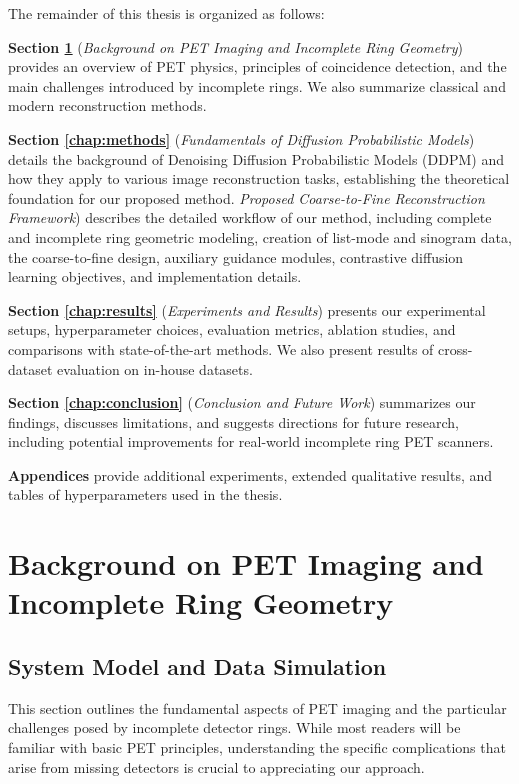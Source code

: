 \documentclass[
reprint,
superscriptaddress,
nofootinbib,
amsmath,amssymb,
aps,
prd,
]{revtex4-2}
\begin{document}
The remainder of this thesis is organized as follows:

\textbf{Section \ref{chap:background}} (\emph{Background on PET Imaging and Incomplete Ring Geometry}) provides an overview of PET physics, principles of coincidence detection, and the main challenges introduced by incomplete rings. We also summarize classical and modern reconstruction methods.

\textbf{Section \ref{chap:methods}} (\emph{Fundamentals of Diffusion Probabilistic Models}) details the background of Denoising Diffusion Probabilistic Models (DDPM) and how they apply to various image reconstruction tasks, establishing the theoretical foundation for our proposed method. \emph{Proposed Coarse-to-Fine Reconstruction Framework}) describes the detailed workflow of our method, including complete and incomplete ring geometric modeling, creation of list-mode and sinogram data, the coarse-to-fine design, auxiliary guidance modules, contrastive diffusion learning objectives, and implementation details.

\textbf{Section \ref{chap:results}} (\emph{Experiments and Results}) presents our experimental setups, hyperparameter choices, evaluation metrics, ablation studies, and comparisons with state-of-the-art methods. We also present results of cross-dataset evaluation on in-house datasets.

\textbf{Section \ref{chap:conclusion}} (\emph{Conclusion and Future Work}) summarizes our findings, discusses limitations, and suggests directions for future research, including potential improvements for real-world incomplete ring PET scanners.

\textbf{Appendices} provide additional experiments, extended qualitative results, and tables of hyperparameters used in the thesis.

\section{Background on PET Imaging and Incomplete Ring Geometry}
\label{chap:background}
\subsection{System Model and Data Simulation}
This section outlines the fundamental aspects of PET imaging and the particular challenges posed by incomplete detector rings. While most readers will be familiar with basic PET principles, understanding the specific complications that arise from missing detectors is crucial to appreciating our approach.
\end{document}
